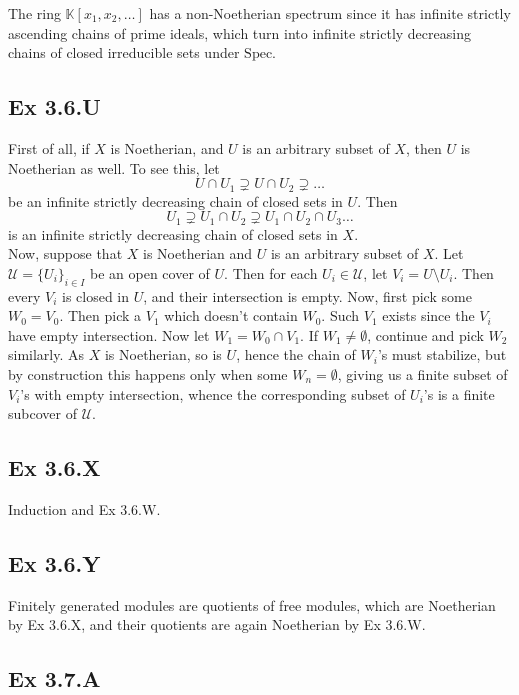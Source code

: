 \documentclass{article}
\theoremstyle{definition}
\newcommand{\K}{\mathbb{K}}
\newcommand{\Spec}{\text{Spec}}
\begin{document}
The ring $\K[x_1,x_2, \ldots]$ has a non-Noetherian spectrum since it has
infinite strictly ascending chains of prime ideals, which turn into infinite
strictly decreasing chains of closed irreducible sets under $\Spec$.

\subsection*{Ex 3.6.U}

First of all, if $X$ is Noetherian, and $U$ is an arbitrary subset of $X$, then
$U$ is Noetherian as well. To see this, let
\[
	U \cap U_1 \supsetneq U \cap U_2 \supsetneq \ldots
\]
be an infinite strictly decreasing chain of closed sets in $U$. Then
\[
	U_1 \supsetneq U_1 \cap U_2 \supsetneq U_1 \cap U_2 \cap U_3 \ldots
\]
is an infinite strictly decreasing chain of closed sets in $X$. \\

Now, suppose that $X$ is Noetherian and $U$ is an arbitrary subset of $X$. Let
$\mathcal{U} = \{U_i\}_{i \in I}$ be an open cover of $U$. Then for each $U_i
	\in \mathcal{U}$, let $V_i = U \setminus U_i$. Then every $V_i$ is closed in
$U$, and their intersection is empty. Now, first pick some $W_0 = V_0$. Then
pick a $V_1$ which doesn't contain $W_0$. Such $V_1$ exists since the $V_i$
have empty intersection. Now let $W_1 = W_0 \cap V_1$. If $W_1 \not =
	\emptyset$, continue and pick $W_2$ similarly. As $X$ is Noetherian, so is $U$,
hence the chain of $W_i$'s must stabilize, but by construction this happens
only when some $W_n = \emptyset$, giving us a finite subset of $V_i$'s with
empty intersection, whence the corresponding subset of $U_i$'s is a finite
subcover of $\mathcal{U}$.


\subsection*{Ex 3.6.X}

Induction and Ex 3.6.W.

\subsection*{Ex 3.6.Y}

Finitely generated modules are quotients of free modules, which are Noetherian
by Ex 3.6.X, and their quotients are again Noetherian by Ex 3.6.W.

\subsection*{Ex 3.7.A}
\end{document}
